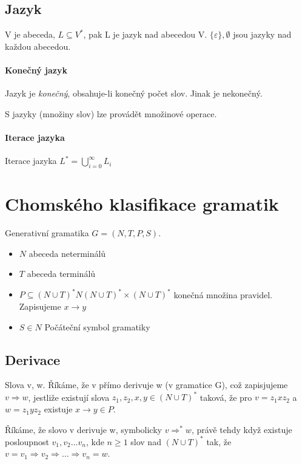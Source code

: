 \documentclass[a4paper, 11pt]{report}
\begin{document}
\subsection{Jazyk}

V je abeceda, $L \subseteq V^*$, pak L je jazyk nad abecedou V. $\{\varepsilon\}, \emptyset$ jsou jazyky nad každou abecedou.

\paragraph{Konečný jazyk}
Jazyk je \emph{konečný}, obsahuje-li konečný počet slov. Jinak je nekonečný.

S jazyky (množiny slov) lze provádět množinové operace.

\paragraph{Iterace jazyka}
Iterace jazyka $L^* = \bigcup^\infty_{i=0} L_i$

\section{Chomského klasifikace gramatik}

Generativní gramatika $G = (N,T,P,S)$.
\begin{itemize}
	\item $N$ abeceda neterminálů
	\item $T$ abeceda terminálů
	\item $P \subseteq (N \cup T)^* N (N \cup T)^* \times (N \cup T)^*$ konečná množina pravidel. Zapisujeme $ x \to y $
	\item $S \in N$ Počáteční symbol gramatiky
\end{itemize}

\subsection{Derivace}
Slova v, w. Říkáme, že v přímo derivuje w (v gramatice G), což zapisjujeme  $v \Rightarrow w$, jestliže existují slova $z_1, z_2, x, y \in (N \cup T)^*$ taková, že pro $v = z_1 x z_2$ a $w = z_1 y z_2$ existuje $x \to y \in P$.	

Říkáme, že slovo v derivuje w, symbolicky $v \Rightarrow^* w$, právě tehdy když existuje posloupnost $v_1, v_2 \dots v_n$, kde $n \geq 1$ slov nad $(N \cup T)^*$ tak, že $v = v_1 \Rightarrow v_2 \Rightarrow \dots \Rightarrow v_n = w$.
\end{document}
